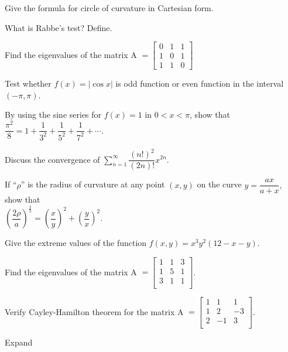 \sub{\subject}
\maxtime

\partA

\iitem Give the formula for circle of curvature in Cartesian form.
\item What is Rabbe's test? Define.
\item Find the eigenvalues of the matrix A $= \begin{bmatrix}
  0 & 1 & 1\\
  1 & 0 & 1\\
  1 & 1 & 0
\end{bmatrix}$
\item Test whether $f(x)=|\cos x|$ is odd function or even function in the interval $(-\pi, \pi)$.
\item By using the sine series for $f(x)=1$  in $0<x<\pi$, show that $\dfrac{\pi^2}{8} = 1 + \dfrac{1}{3^2} +
  \dfrac{1}{5^2} + \dfrac{1}{7^2}+\cdots$.

\markA
\partB

\item Discuss the convergence of $\sum\limits_{n=1}^{\infty} \dfrac{(n!)^2}{(2n)!}x^{2n}$.\\
\item If ``$\rho$'' is the radius of curvature at any point $(x,y)$ on the curve $y = \dfrac{ax}{a+x},$
  show that\\
  ${\left( \dfrac{2\rho}{a} \right)}^{\frac{2}{3}} = {\left( \dfrac{x}{y} \right)}^2 + {
     \left(\dfrac{y}{x}\right)}^2$.\\
\item Give the extreme values of the function $f(x,y) = x^3 y^2(12-x-y)$.\\
\item Find the eigenvalues of the matrix A $= \begin{bmatrix}
      1 & 1 & 3\\
      1 & 5 & 1\\
      3 & 1 & 1\\
      \end{bmatrix}$.

\newpage \again

\item Verify Cayley-Hamilton theorem for the matrix A $ = \begin{bmatrix}
       1 & 1 & 1\\
       1 &  2 & -3\\
       2 & -1 & 3 \\
       \end{bmatrix}$.
\item Expand

